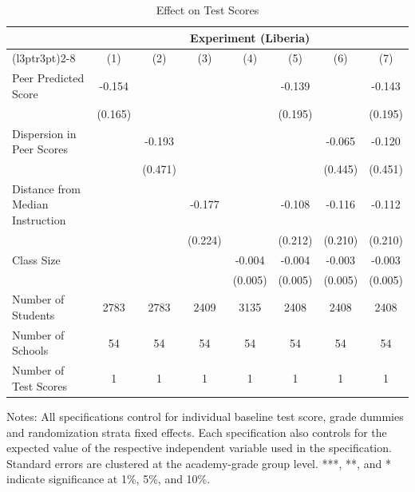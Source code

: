 \begin{table}[!h]
\centering\centering\centering
\caption{Effect on Test Scores}
\centering
\begin{threeparttable}
\fontsize{10}{12}\selectfont
\begin{tabular}[t]{lccccccc}
\toprule
\multicolumn{1}{c}{ } & \multicolumn{7}{c}{Experiment (Liberia)} \\
\cmidrule(l{3pt}r{3pt}){2-8}
  & (1) & (2) & (3) & (4) & (5) & (6) & (7)\\
\midrule
Peer Predicted Score & -0.154 &  &  &  & -0.139 &  & -0.143\\
 & (0.165) &  &  &  & (0.195) &  & (0.195)\\
Dispersion in Peer Scores &  & -0.193 &  &  &  & -0.065 & -0.120\\
 &  & (0.471) &  &  &  & (0.445) & (0.451)\\
Distance from Median Instruction &  &  & -0.177 &  & -0.108 & -0.116 & -0.112\\
 &  &  & (0.224) &  & (0.212) & (0.210) & (0.210)\\
Class Size &  &  &  & -0.004 & -0.004 & -0.003 & -0.003\\
 &  &  &  & (0.005) & (0.005) & (0.005) & (0.005)\\
\hline
\midrule
Number of Students & 2783 & 2783 & 2409 & 3135 & 2408 & 2408 & 2408\\
Number of Schools & 54 & 54 & 54 & 54 & 54 & 54 & 54\\
Number of Test Scores & 1 & 1 & 1 & 1 & 1 & 1 & 1\\
\bottomrule
\end{tabular}
\begin{tablenotes}[para]
\item Notes: All specifications control for individual baseline test score,
                        grade dummies and randomization strata fixed effects. Each specification
                        also controls for the expected value of the respective independent variable
                         used in the specification. Standard errors are clustered at the academy-grade
                          group level. ***, **, and * indicate significance at 1\%, 5\%, and 10\%.
\end{tablenotes}
\end{threeparttable}
\end{table}
